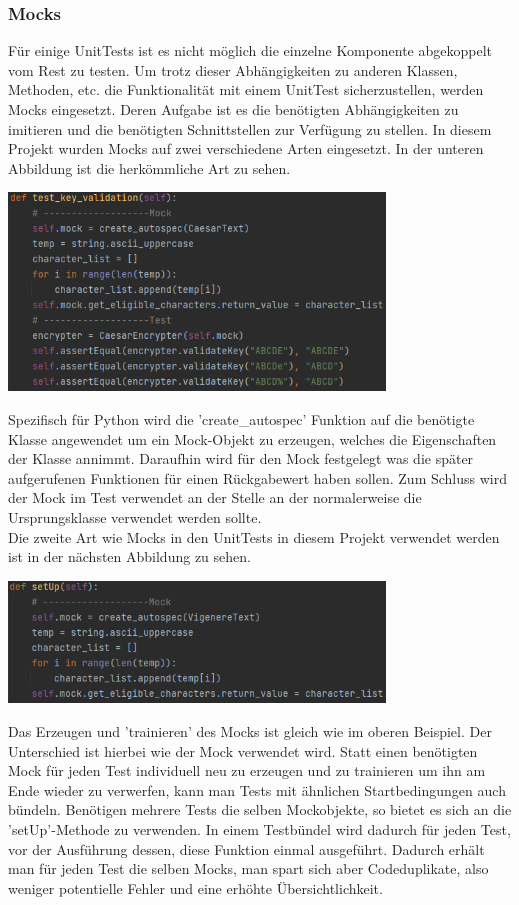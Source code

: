 \documentclass[12pt]{article}
\begin{document}
\subsubsection{Mocks}
\label{Mocks}
Für einige UnitTests ist es nicht möglich die einzelne Komponente abgekoppelt vom Rest zu testen. Um trotz dieser Abhängigkeiten zu anderen Klassen, Methoden, etc. die Funktionalität mit einem UnitTest sicherzustellen, werden Mocks eingesetzt. Deren Aufgabe ist es die benötigten Abhängigkeiten zu imitieren und die benötigten Schnittstellen zur Verfügung zu stellen. In diesem Projekt wurden Mocks auf zwei verschiedene Arten eingesetzt. In der unteren Abbildung ist die herkömmliche Art zu sehen.
\begin{center}
	\includegraphics[width=10cm]{bilder/Mocks1.png}
\end{center}
Spezifisch für Python wird die 'create\_autospec' Funktion auf die benötigte Klasse angewendet um ein Mock-Objekt zu erzeugen, welches die Eigenschaften der Klasse annimmt. Daraufhin wird für den Mock festgelegt was die später aufgerufenen Funktionen für einen Rückgabewert haben sollen. Zum Schluss wird der Mock im Test verwendet an der Stelle an der normalerweise die Ursprungsklasse verwendet werden sollte.\\
Die zweite Art wie Mocks in den UnitTests in diesem Projekt verwendet werden ist in der nächsten Abbildung zu sehen.
\begin{center}
	\includegraphics[width=10cm]{bilder/Mocks2.png}
\end{center}
Das Erzeugen und 'trainieren' des Mocks ist gleich wie im oberen Beispiel. Der Unterschied ist hierbei wie der Mock verwendet wird. Statt einen benötigten Mock für jeden Test individuell neu zu erzeugen und zu trainieren um ihn am Ende wieder zu verwerfen, kann man Tests mit ähnlichen Startbedingungen auch bündeln. Benötigen mehrere Tests die selben Mockobjekte, so bietet es sich an die 'setUp'-Methode zu verwenden. In einem Testbündel wird dadurch für jeden Test, vor der Ausführung dessen, diese Funktion einmal ausgeführt. Dadurch erhält man für jeden Test die selben Mocks, man spart sich aber Codeduplikate, also weniger potentielle Fehler und eine erhöhte Übersichtlichkeit. 
\end{document}
